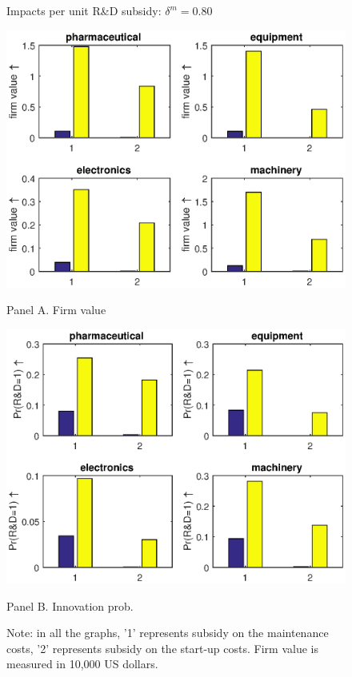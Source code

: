 \documentclass[11pt]{article}
\begin{document}
\begin{figure}[h]
    \caption{Impacts per unit R\&D subsidy: $\delta^m=0.80$}
    \label{F7}
    \centering
    \begin{minipage}{0.48\textwidth}
      \includegraphics[width=\textwidth]{Figs/valuechangePerUnit.eps}  
      \caption*{Panel A. Firm value}      
    \end{minipage}
    \hfill
    \begin{minipage}{0.48\textwidth}
        \includegraphics[width=\textwidth]{Figs/probchangePerUnit.eps}
        \caption*{Panel B. Innovation prob.}
    \end{minipage}
    \caption*{\small{}Note: in all the graphs, '1' represents subsidy on the maintenance costs, '2' represents subsidy on the start-up costs. Firm value is measured in 10,000 US dollars.}{\small \par}
    \end{figure}
\end{document}
